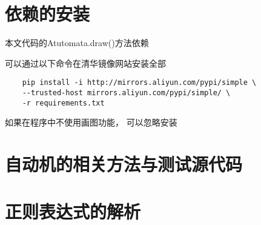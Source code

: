 \documentclass[pdfCover]{myreport} %
\begin{document}
\begin{appendices}
  \section{依赖的安装}
    本文代码的Atutomata.draw()方法依赖
    
    可以通过以下命令在清华镜像网站安装全部
    \begin{lstlisting}
    pip install -i http://mirrors.aliyun.com/pypi/simple \
    --trusted-host mirrors.aliyun.com/pypi/simple/ \
    -r requirements.txt
    \end{lstlisting}
    如果在程序中不使用画图功能，
    可以忽略安装

  \section{自动机的相关方法与测试源代码}
    
  \section{正则表达式的解析}
    
\end{appendices}
\end{document}
